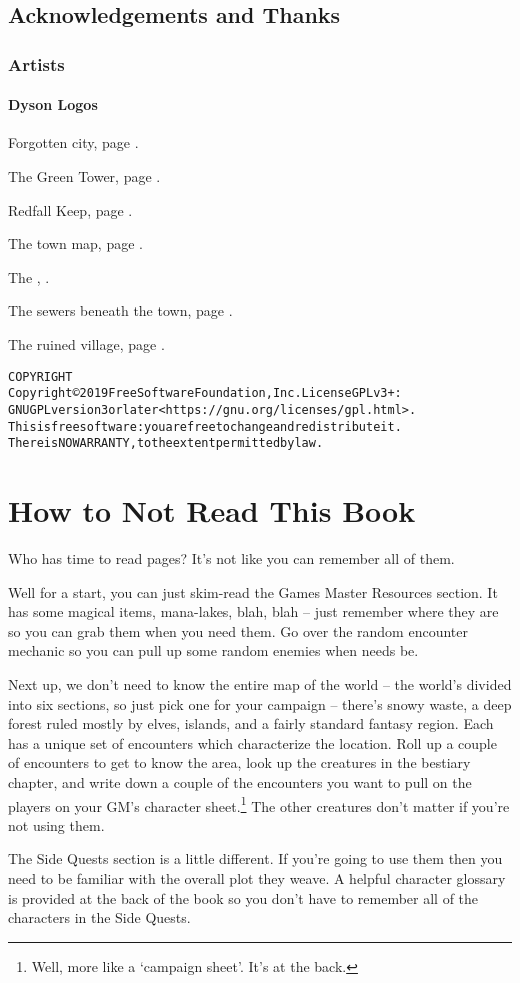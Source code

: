 
\section*{Acknowledgements and Thanks}

\subsection*{Artists}

\subsubsection{Dyson Logos}

Forgotten city, page \pageref{lost_city_map}.

The Green Tower, page \pageref{green_tower_map}.

Redfall Keep, page \pageref{redfall_keep_map}.

The town map, page \pageref{town_map}.

The , \pageref{mincing_pig_map}.

The sewers beneath the town, page \pageref{sewer_map}.

The ruined village, page \pageref{ruined_village_map}.

\begin{alltt}
COPYRIGHT
       Copyright \copyright 2019 Free Software Foundation, Inc.  License GPLv3+:
	GNU GPL version 3 or later <https://gnu.org/licenses/gpl.html>.
       This is free software: you are free to change and redistribute it.
	There is NO WARRANTY, to the extent permitted by law.

\end{alltt}

\chapter*{How to Not Read This Book}

Who has time to read \pageref{lastpage} pages?  It's not like you can remember all of them.

Well for a start, you can just skim-read the Games Master Resources section.  It has some magical items, mana-lakes, blah, blah -- just remember where they are so you can grab them when you need them.  Go over the random encounter mechanic so you can pull up some random enemies when needs be.

Next up, we don't need to know the entire map of the world -- the world's divided into six sections, so just pick one for your campaign -- there's snowy waste, a deep forest ruled mostly by elves, islands, and a fairly standard fantasy region.  Each has a unique set of encounters which characterize the location.  Roll up a couple of encounters to get to know the area, look up the creatures in the bestiary chapter, and write down a couple of the encounters you want to pull on the players on your GM's character sheet.\footnote{Well, more like a `campaign sheet'.  It's at the back.}  The other creatures don't matter if you're not using them.

The Side Quests section is a little different.  If you're going to use them then you need to be familiar with the overall plot they weave.  A helpful character glossary is provided at the back of the book so you don't have to remember all of the characters in the Side Quests.


